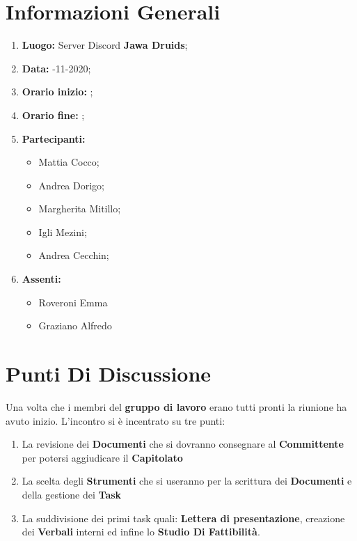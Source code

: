 \newpage
	\section{Informazioni Generali}
	\begin{enumerate}
		\item \textbf{Luogo:} \normalfont Server Discord \textbf{Jawa Druids};
		\item \textbf{Data:} -11-2020;
		\item \textbf{Orario inizio:} ;
		\item \textbf{Orario fine:} ;
		\item \textbf{Partecipanti:}
		\begin{itemize}
			\item Mattia Cocco; 
			\item Andrea Dorigo;
			\item Margherita Mitillo;
			\item Igli Mezini;
			\item Andrea Cecchin;
		\end{itemize}
		\item \textbf{Assenti:}
		\begin{itemize}
			\item Roveroni Emma
			\item Graziano Alfredo
		\end{itemize}
	\end{enumerate}
	\section{Punti Di Discussione}
	Una volta che i membri del \textbf{gruppo di lavoro} erano tutti pronti la riunione ha avuto inizio.
	L'incontro si è incentrato su tre punti:
	\begin{enumerate}
		\item La revisione dei \textbf{Documenti} che si dovranno consegnare al \textbf{Committente} per potersi aggiudicare il \textbf{Capitolato}
		
		\item La scelta degli \textbf{Strumenti} che si useranno per la scrittura dei \textbf{Documenti} e della gestione dei \textbf{Task}
		
		\item La suddivisione dei primi task quali: \textbf{Lettera di presentazione}, creazione dei \textbf{Verbali} interni ed infine lo \textbf{Studio Di Fattibilità}.
	\end{enumerate}

